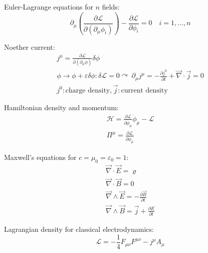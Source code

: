 \documentclass[fontsize=11pt,a4paper]{scrartcl}
\begin{document}
Euler-Lagrange equations for $n$ fields:
\[
	\partial_\mu\left(\frac{\partial\mathcal{L}}{\partial\left(\partial_\mu\phi_i\right)}\right) - \frac{\partial\mathcal{L}}{\partial\phi_i} = 0\quad i=1,\dots,n
\]

Noether current:
\begin{gather*}
	j^\mu=\frac{\partial\mathcal{L}}{\partial\left(\partial_\mu\phi\right)}\delta\phi\\
	\phi\to\phi+\varepsilon\delta\phi: \delta\mathcal{L}=0
	\curvearrowright\,\partial_\mu j^\mu=-\frac{\partial j^0}{\partial t} + \vec\nabla\cdot\vec j = 0\\
	j^0: \text{charge density}, \vec j: \text{current density}
\end{gather*}

Hamiltonian density and momentum:
\begin{gather*}
	\mathcal{H}=\frac{\partial\mathcal{L}}{\partial\dot\phi_\mu}\dot\phi_\mu - \mathcal{L}\\
	\Pi^\mu = \frac{\partial\mathcal{L}}{\partial\dot\phi_\mu}
\end{gather*}

Maxwell's equations for $c=\mu_0=\varepsilon_0=1$:
\begin{gather*}
	\vec\nabla\cdot\vec E=\varrho\\
	\vec\nabla\cdot\vec B=0\\
	\vec\nabla\wedge\vec E=-\frac{\partial\vec B}{\partial t}\\
	\vec\nabla\wedge\vec B=\vec j+\frac{\partial E}{\partial t}
\end{gather*}

Lagrangian density for classical electrodynamics:
\[
	\mathcal{L}=-\frac{1}{4} F_{\mu\nu} F^{\mu\nu} - j^\mu A_\mu
\]
\end{document}
